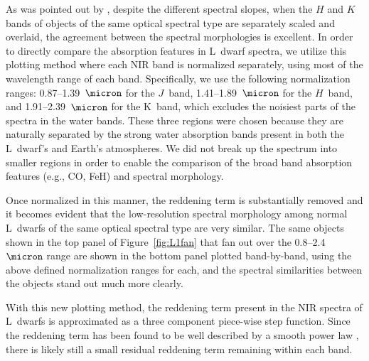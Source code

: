 \documentclass[12pt,preprint]{aastex}
\begin{document}

As was pointed out by \citet{Leggett:2003tm}, despite the different spectral slopes, when the $H$ and $K$ bands of objects of the same optical spectral type are separately scaled and overlaid, the agreement between the spectral morphologies is excellent.
In order to directly compare the absorption features in L~dwarf spectra, we utilize this plotting method where each NIR band is normalized separately, using most of the wavelength range of each band. 
Specifically, we use the following normalization ranges: 0.87--1.39~$\micron$ for the $J$~band, 1.41--1.89~$\micron$ for the $H$~band, and 1.91--2.39~$\micron$ for the K~band, which excludes the noisiest parts of the spectra in the water bands.
These three regions were chosen because they are naturally separated by the strong water absorption bands present in both the L~dwarf's and Earth's atmospheres. We did not break up the spectrum into smaller regions in order to enable the comparison of the broad band absorption features (e.g., CO, FeH) and spectral morphology.

Once normalized in this manner, the reddening term is substantially removed and it becomes evident that the low-resolution spectral morphology among normal L~dwarfs of the same optical spectral type are very similar. 
The same objects shown in the top panel of Figure~\ref{fig:L1fan} that fan out over the 0.8--2.4~$\micron$ range are shown in the bottom panel plotted band-by-band, using the above defined normalization ranges for each, and the spectral similarities between the objects stand out much more clearly.

With this new plotting method, the reddening term present in the NIR spectra of L~dwarfs is approximated as a three component piece-wise step function. Since the reddening term has been found to be well described by a smooth power law \citep[in prep.]{Hiranaka13,Marocco:2014kr}, there is likely still a small residual reddening term remaining within each band.
\end{document}
